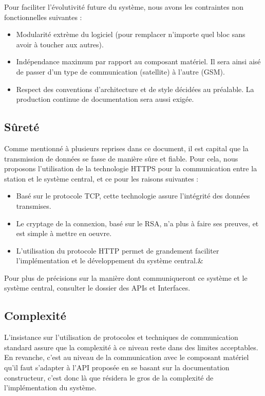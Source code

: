 Pour faciliter l'évolutivité future du système, nous avons les contraintes non fonctionnelles suivantes :

\begin{itemize}
\item Modularité extrème du logiciel (pour remplacer n'importe quel bloc sans avoir à toucher aux autres).
\item Indépendance maximum par rapport au composant matériel. Il sera ainsi aisé de passer d'un type de communication (satellite) à l'autre (GSM).
\item Respect des conventions d'architecture et de style décidées au préalable. La production continue de documentation sera aussi exigée.
\end{itemize}

\subsection{Sûreté}

Comme mentionné à plusieurs reprises dans ce document, il est capital que la transmission de données se fasse de manière sûre et fiable. Pour cela, nous proposons l'utilisation de la technologie HTTPS pour la communication entre la station et le système central, et ce pour les raisons suivantes :

\begin{itemize}
\item Basé sur le protocole TCP, cette technologie assure l'intégrité des données transmises.
\item Le cryptage de la connexion, basé sur le RSA, n'a plus à faire ses preuves, et est simple à mettre en oeuvre.
\item L'utilisation du protocole HTTP permet de grandement faciliter l'implémentation et le développement du système central.&
\end{itemize}

Pour plus de précisions sur la manière dont communiqueront ce système et le système central, consulter le dossier des APIs et Interfaces.

\subsection{Complexité}

L'insistance sur l'utilisation de protocoles et techniques de communication standard assure que la complexité à ce niveau reste dans des limites acceptables. En revanche, c'est au niveau de la communication avec le composant matériel qu'il faut s'adapter à l'API proposée en se basant sur la documentation constructeur, c'est donc là que résidera le gros de la complexité de l'implémentation du système.

